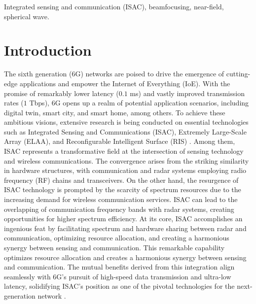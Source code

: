 \documentclass[10pt,journal,twocolumn,twoside]{IEEEtran} %
\begin{document}
\begin{IEEEkeywords}
Integrated sensing and communication (ISAC), beamfocusing, near-field, spherical wave.
\end{IEEEkeywords}


\section{Introduction} 
The sixth generation (6G) networks are poised to drive the emergence of cutting-edge applications and empower the Internet of Everything (IoE). With the promise of remarkably lower latency ($0.1$ ms) and vastly improved transmission rates ($1$ Tbps),  6G opens up a realm of potential application scenarios, including digital twin, smart city, and smart home, among others. To achieve these ambitious visions, extensive research is being conducted on essential technologies such as Integrated Sensing and Communications (ISAC), Extremely Large-Scale Array (ELAA), and Reconfigurable Intelligent Surface (RIS) \cite{Jia2020}.
Among them, ISAC represents a transformative field at the intersection of sensing technology and wireless communications.
The convergence arises from the striking similarity in hardware structures, with communication and radar systems employing radio frequency (RF) chains and transceivers.
 On the other hand, the resurgence of ISAC technology is prompted by the scarcity of spectrum resources due to the increasing demand for wireless communication services. ISAC can lead to the overlapping of communication frequency bands with radar systems, creating opportunities for higher spectrum efficiency.
 At its core, ISAC accomplishes an ingenious feat by facilitating spectrum and hardware sharing between radar and communication, optimizing resource allocation, and creating a harmonious synergy between sensing and communication. This remarkable capability optimizes resource allocation and creates a harmonious synergy between sensing and communication. 
The mutual benefits derived from this integration align seamlessly with 6G's pursuit of high-speed data transmission and ultra-low latency, solidifying ISAC's position as one of the pivotal technologies for the next-generation network \cite{CongFinite2022, ShuaishuaiGuo:Mobicom2022}.
\end{document}
